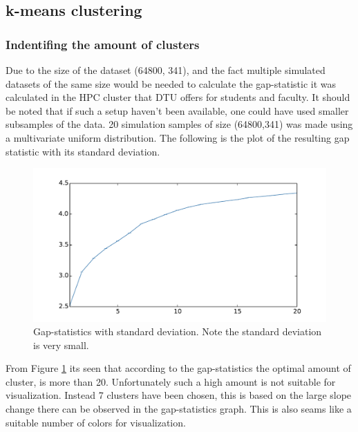 \subsection{k-means clustering}
\label{section:result-kmeans}

\subsubsection{Indentifing the amount of clusters}
Due to the size of the dataset (64800, 341), and the fact multiple simulated datasets of the same size would be needed to calculate the gap-statistic it was calculated in the HPC cluster that DTU offers for students and faculty.
It should be noted that if such a setup haven't been available, one could have used smaller subsamples of the data.
20 simulation samples of size (64800,341) was made using a multivariate uniform distribution. The following is the plot of the resulting gap statistic with its standard deviation.
\begin{figure}[H]
	\center
	\includegraphics[width=\textwidth]{figures/kmeans-gap}
	\caption{Gap-statistics with standard deviation. Note the standard deviation is very small.}
	\label{fig:kmeans-gap}
\end{figure}

From Figure \ref{fig:kmeans-gap} its seen that according to the gap-statistics the optimal amount of cluster, is more than 20. Unfortunately such a high amount is not suitable for visualization. Instead 7 clusters have been chosen, this is based on the large slope change there can be observed in the gap-statistics graph. This is also seams like a suitable number of colors for visualization.

